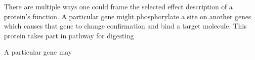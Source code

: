 
There are multiple ways one could frame the selected effect description of a protein's function.  A particular gene might phosphorylate a site on another genes which causes that gene to change confirmation and bind a target molecule.  This protein takes part in pathway for digesting 


A particular gene may 
